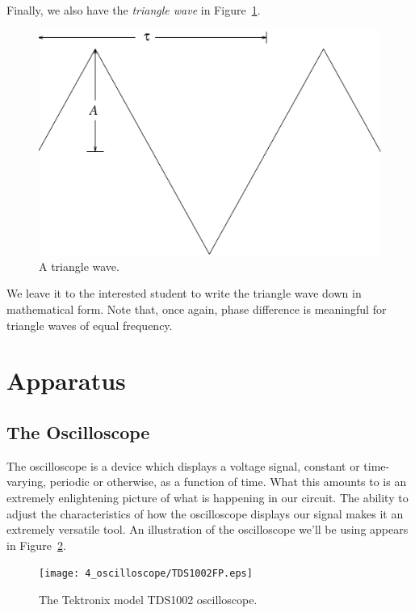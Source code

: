 Finally, we also have the {\it triangle wave} in 
Figure~\ref{fig:scope:triwave}.
\begin{figure}[htb]
\centering \epsfxsize=8cm \includegraphics[scale=0.5]{4_oscilloscope/triwave.eps}
\caption{A triangle wave.}
\label{fig:scope:triwave}
\end{figure}
We leave it to the interested student to write the triangle wave down in 
mathematical form. Note that, once again, phase difference is meaningful for
triangle waves of equal frequency.

\section{Apparatus}

\subsection{The Oscilloscope}

The oscilloscope is a device which displays a voltage signal, constant or 
time-varying, periodic or otherwise, as a function of time.  What this amounts
to is an extremely enlightening picture of what is happening in our circuit.
The ability to adjust the characteristics of how the oscilloscope displays our
signal makes it an extremely versatile tool.  An illustration of the 
oscilloscope we'll be using appears in Figure~\ref{fig:scope:oscope}.
\begin{figure}[htb]
\centering \epsfxsize=16cm \texttt{[image: 4\_oscilloscope/TDS1002FP.eps]}
\caption{The Tektronix model TDS1002 oscilloscope.}
\label{fig:scope:oscope}
\end{figure}

